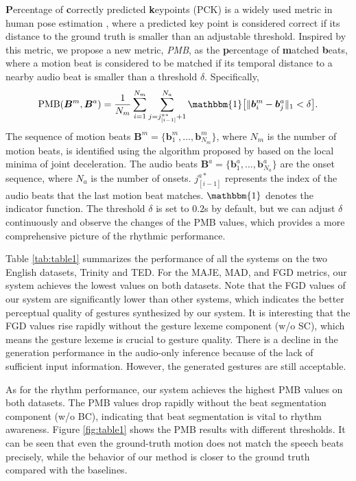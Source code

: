 \documentclass[acmtog,authorversion]{acmart}
\newcommand{\vect}[1]{\bm{#1}}
\newcommand{\eqword}[1]{{\text{#1}}}
\begin{document}
\textbf{P}ercentage of \textbf{c}orrectly predicted \textbf{k}eypoints (PCK)  is a widely used metric in human pose estimation \cite{Wei_2016_openpose, mehta2017vnect}, where a predicted key point is considered correct if its distance to the ground truth is smaller than an adjustable threshold. Inspired by this metric, we propose a new metric, \emph{PMB}, as the \textbf{p}ercentage of \textbf{m}atched \textbf{b}eats, where a motion beat is considered to be matched if its temporal distance to a nearby audio beat is smaller than a threshold $\delta$. Specifically,
\begin{equation}
    \eqword{PMB}(\vect{B}^{{m}}, \vect{B}^{{a}}) = \frac{1}{N_m}\sum^{N_m}_{i=1}\sum^{N_a}_{j=j_{[i-1]}^{{a}*}+1} \mathbbm{1}\big[\lVert \vect{b}_i^{{m}} - \vect{b}_j^{{a}} \rVert_1 < \delta\big].
\end{equation}
The sequence of motion beats $\vect{B}^{{m}}=\{\vect{b}_1^{{m}}, \dots, \vect{b}_{N_m}^{{m}}\}$, where $N_m$ is the number of motion beats, is identified using the algorithm proposed by \citet{ho2013motionbeat} based on the local minima of joint deceleration. 
The audio beats $\vect{B}^{{a}}=\{\vect{b}_1^{{a}}, \dots, \vect{b}_{N_a}^{{a}}\}$ are the onset sequence, where $N_a$ is the number of onsets. $j_{[i-1]}^{{a}*}$ represents the index of the audio beats that the last motion beat matches. $\mathbbm{1}$ denotes the indicator function. The threshold $\delta$ is set to $0.2$s by default, but we can adjust $\delta$ continuously and observe the changes of the PMB values, which provides a more comprehensive picture of the rhythmic performance.

Table \ref{tab:table1} summarizes the performance of all the systems on the two English datasets, Trinity and TED. For the MAJE, MAD, and FGD metrics, our system achieves the lowest values on both datasets. Note that the FGD values of our system are significantly lower than other systems, which indicates the better perceptual quality of gestures synthesized by our system. It is interesting that the FGD values rise rapidly without the gesture lexeme component (w/o SC), which means the gesture lexeme is crucial to gesture quality. There is a decline in the generation performance in the audio-only inference because of the lack of sufficient input information. However, the generated gestures are still acceptable.

As for the rhythm performance, our system achieves the highest PMB values on both datasets. The PMB values drop rapidly without the beat segmentation component (w/o BC), indicating that beat segmentation is vital to rhythm awareness. Figure \ref{fig:table1} shows the PMB results with different thresholds. It can be seen that even the ground-truth motion does not match the speech beats precisely, while the behavior of our method is closer to the ground truth compared  with the baselines.
\end{document}
